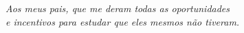 \documentclass[
	12pt,				%
	openright,			%
	oneside,			%
	a4paper,			%
	chapter=TITLE,		%
	section=TITLE,		%
	subsection=TITLE,	%
	subsubsection=TITLE,%
	english,			%
	brazil				%
	]{abntex2}
\theoremstyle{definition}
\begin{document}
\nocite{Vrs:2018}

\frenchspacing 



\imprimircapa

\imprimirfolhaderosto


%     


\newpage

%
\begin{folhadeaprovacao}
\end{folhadeaprovacao}





\begin{dedicatoria}
   \vspace*{\fill}
   \flushright
   \textit{Aos meus pais, que me deram todas as oportunidades \\e incentivos para estudar que eles mesmos não tiveram.}
\end{dedicatoria}
\end{document}
